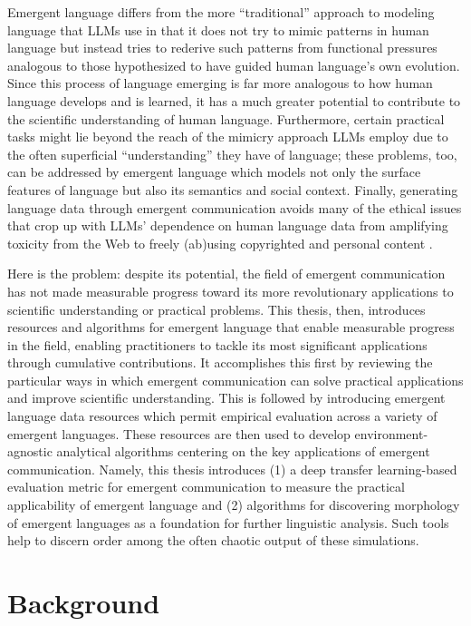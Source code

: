 Emergent language differs from the more ``traditional'' approach to modeling language that LLMs use in that it does not try to mimic patterns in human language but instead tries to rederive such patterns from functional pressures analogous to those hypothesized to have guided human language's own evolution.
Since this process of language emerging is far more analogous to how human language develops and is learned, it has a much greater potential to contribute to the scientific understanding of human language.
Furthermore, certain practical tasks might lie beyond the reach of the mimicry approach LLMs employ due to the often superficial ``understanding'' they have of language; these problems, too, can be addressed by emergent language which models not only the surface features of language but also its semantics and social context.
Finally, generating language data through emergent communication avoids many of the ethical issues that crop up with LLMs' dependence on human language data from amplifying toxicity from the Web to freely (ab)using copyrighted and personal content \citep{weidinger2021ethicalsocialrisksharm,carlini2021extractingtrainingdatalarge}.

Here is the problem: despite its potential, the field of emergent communication has not made measurable progress toward its more revolutionary applications to scientific understanding or practical problems.
This thesis, then, introduces resources and algorithms for emergent language that enable measurable progress in the field, enabling practitioners to tackle its most significant applications through cumulative contributions.
It accomplishes this first by reviewing the particular ways in which emergent communication can solve practical applications and improve scientific understanding.
This is followed by introducing emergent language data resources which permit empirical evaluation across a variety of emergent languages.
These resources are then used to develop environment-agnostic analytical algorithms centering on the key applications of emergent communication.
Namely, this thesis introduces
  (1) a deep transfer learning-based evaluation metric for emergent communication to measure the practical applicability of emergent language
  and (2) algorithms for discovering morphology of emergent languages as a foundation for further linguistic analysis.
Such tools help to discern order among the often chaotic output of these simulations.

\section{Background}

